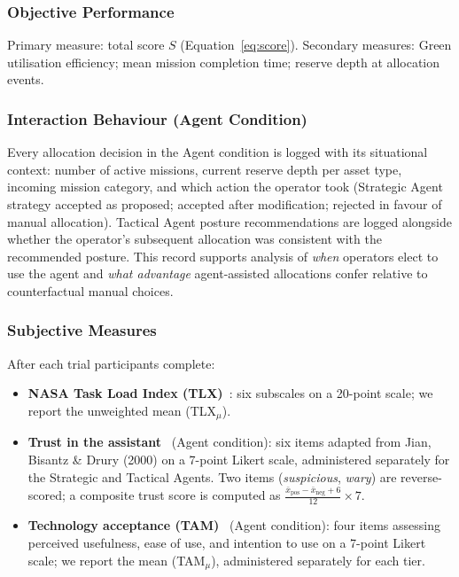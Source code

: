 \documentclass[10pt]{article}
\theoremstyle{definition}
\begin{document}
\subsubsection{Objective Performance}

Primary measure: total score $S$ (Equation~\ref{eq:score}). Secondary measures: Green utilisation efficiency; mean mission completion time; reserve depth at allocation events.

\subsubsection{Interaction Behaviour (Agent Condition)}

Every allocation decision in the Agent condition is logged with its situational context: number of active missions, current reserve depth per asset type, incoming mission category, and which action the operator took (Strategic Agent strategy accepted as proposed; accepted after modification; rejected in favour of manual allocation). Tactical Agent posture recommendations are logged alongside whether the operator's subsequent allocation was consistent with the recommended posture. This record supports analysis of \emph{when} operators elect to use the agent and \emph{what advantage} agent-assisted allocations confer relative to counterfactual manual choices.

\subsubsection{Subjective Measures}

After each trial participants complete:
\begin{itemize}[noitemsep]
  \item \textbf{NASA Task Load Index (TLX)}~\cite{hart1988nasa}: six subscales on a 20-point scale; we report the unweighted mean (TLX$_\mu$).
  \item \textbf{Trust in the assistant}~\cite{jian2000foundations} (Agent condition): six items adapted from Jian, Bisantz \& Drury (2000) on a 7-point Likert scale, administered separately for the Strategic and Tactical Agents. Two items (\textit{suspicious}, \textit{wary}) are reverse-scored; a composite trust score is computed as $\frac{\bar{x}_{\mathrm{pos}} - \bar{x}_{\mathrm{neg}} + 6}{12}\times 7$.
  \item \textbf{Technology acceptance (TAM)}~\cite{davis1989perceived} (Agent condition): four items assessing perceived usefulness, ease of use, and intention to use on a 7-point Likert scale; we report the mean (TAM$_\mu$), administered separately for each tier.
\end{itemize}
\end{document}
